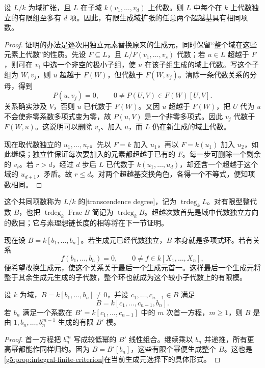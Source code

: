 \begin{lemma}\label{g5:lem:transcendence-bound}
	设 \(L/k\) 为域扩张，且 \(L\) 在子域 \(k(v_1,\ldots,v_d)\) 上代数。则 \(L\) 中每个在 \(k\) 上代数独立的有限组至多有 \(d\) 项。因此，有限生成域扩张的任意两个超越基具有相同项数。
\end{lemma}
\begin{proof}
	证明的办法是逐次用独立元素替换原来的生成元，同时保留“整个域在这些元素上代数”的性质。先设 \(F\subseteq L\)，且 \(L/F(v_1,\ldots,v_s)\) 代数；若 \(u\in L\) 超越于 \(F\)，则可在 \(v_i\) 中选一个非空的极小子组，使 \(u\) 在该子组生成的域上代数。写这个子组为 \(W,v_j\)，则 \(u\) 超越于 \(F(W)\)，但代数于 \(F(W,v_j)\)。清除一条代数关系的分母，得到
	\[
	P(u,v_j)=0,\qquad 0\ne P(U,V)\in F(W)[U,V].
	\]
	关系确实涉及 \(V\)，否则 \(u\) 已代数于 \(F(W)\)。又因 \(u\) 超越于 \(F(W)\)，把 \(U\) 代为 \(u\) 不会使非零系数多项式变为零，故 \(P(u,V)\) 是一个非零多项式。因此 \(v_j\) 代数于 \(F(W,u)\)。这说明可以删除 \(v_j\)、加入 \(u\)，而 \(L\) 仍在新生成的域上代数。

	现在取代数独立的 \(u_1,\ldots,u_r\)。先以 \(F=k\) 加入 \(u_1\)，再以 \(F=k(u_1)\) 加入 \(u_2\)，如此继续；独立性保证每次要加入的元素都超越于已有的 \(F\)。每一步可删除一个剩余的 \(v_i\)。若 \(r>d\)，经过 \(d\) 步后 \(L\) 已代数于 \(k(u_1,\ldots,u_d)\)，却还含一个超越于这个域的 \(u_{d+1}\)，矛盾。故 \(r\leq d\)。对两个超越基交换角色，各得一个不等式，便知项数相同。
\end{proof}

这个共同项数称为 \(L/k\) 的[transcendence degree]，记为 \(\operatorname{trdeg}_k L\)。对有限型整代数 \(B\)，也把 \(\operatorname{trdeg}_k\operatorname{Frac}B\) 简记为 \(\operatorname{trdeg}_k B\)。超越次数首先是域中代数独立方向的数目；它与素理想链长度的相等将在下一节证明。

\ProseParagraphBreak

现在设 \(B=k[b_1,\ldots,b_n]\)。若生成元已经代数独立，\(B\) 本身就是多项式环。若有关系
\[
	f(b_1,\ldots,b_n)=0,\qquad 0\ne f\in k[X_1,\ldots,X_n],
\]
便希望改换生成元，使这个关系关于最后一个生成元首一。这样最后一个生成元将整于其余生成元生成的子代数，整个环也就成为这个较小子代数上的有限模。

\begin{lemma}\label{g5:lem:monic-elimination}
	设 \(k\) 为域，\(B=k[b_1,\ldots,b_n]\ne0\)，并设 \(c_1,\ldots,c_{n-1}\in B\) 满足
	\[
	B=k[c_1,\ldots,c_{n-1},b_n].
	\]
	若 \(b_n\) 满足一个系数在 \(B'=k[c_1,\ldots,c_{n-1}]\) 中的 \(m\) 次首一方程，\(m\geq1\)，则 \(B\) 是由 \(1,b_n,\ldots,b_n^{m-1}\) 生成的有限 \(B'\) 模。
\end{lemma}
\begin{proof}
	首一方程把 \(b_n^m\) 写成较低幂的 \(B'\) 线性组合。继续乘以 \(b_n\) 并递推，所有更高幂都能作同样归约。因为 \(B=B'[b_n]\)，这些有限个幂便生成整个 \(B\)。这也是\cref{g5:prop:integral-finite-criterion}在当前生成元选择下的具体形式。
\end{proof}

